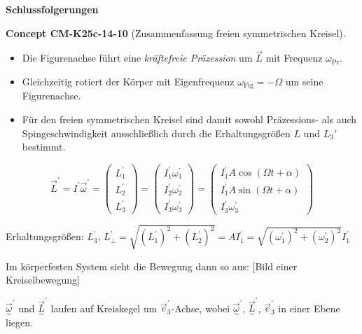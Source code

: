 \documentclass[10pt, letterpaper]{article}
\newcommand{\CustomHeading}[3]{%
  \par\medskip\noindent%
  \textbf{#1 #2} \textnormal{(#3)}.\enskip%
}
\newenvironment{CONC}[2]{\begin{unitbox}\CustomHeading{Concept}{#1}{#2}}{\end{unitbox}}
\begin{document}
\textbf{Schlussfolgerungen}

\begin{CONC}{CM-K25c-14-10}{Zusammenfassung freien symmetrischen Kreisel}
\begin{itemize}
\item Die Figurenachse führt eine \emph{kräftefreie Präzession} um
      $\vec L$ mit Frequenz $\omega_{\!\text{Pr}}$.
\item Gleichzeitig rotiert der Körper mit
      Eigenfrequenz $\omega_{\!\text{Fig}}=-\Omega$ um seine
      Figurenachse.
\item Für den freien symmetrischen Kreisel sind damit sowohl
      Präzessions- als auch Spingeschwindigkeit ausschließlich durch die
      Erhaltungsgrößen $L$ und $L_3'$ bestimmt.
\end{itemize}
\end{CONC}











\[
\vec{L}^\prime = I^\prime \vec{\omega}^\prime 
= \begin{pmatrix} L_1^\prime \\ L_2^\prime \\ L_3^\prime \end{pmatrix} 
= \begin{pmatrix} I_1^\prime \omega_1^\prime \\ I_2^\prime \omega_2^\prime \\ I_3^\prime \omega_3^\prime \end{pmatrix} 
= \begin{pmatrix} I_1^\prime A \cos(\Omega t + \alpha) \\ I_1^\prime A \sin(\Omega t + \alpha) \\ I_3^\prime \omega_3^\prime \end{pmatrix}
\]

Erhaltungsgrößen: $L_3^\prime$, $L_\perp^\prime = \sqrt{(L_1^\prime)^2+(L_2^\prime)^2} = AI_1^\prime = \sqrt{(\omega_1^\prime)^2+(\omega_2^\prime)^2}I_1^\prime$

Im körperfesten System sieht die Bewegung dann so aus: [Bild einer Kreiselbewegung]

$\vec{\underset{\sim}{\omega}}^\prime$ und $\vec{\underset{\sim}{L}}^\prime$ laufen auf Kreiskegel um $\vec{e}_3^\prime$-Achse, wobei $\vec{\underset{\sim}{\omega}}^\prime$, $\vec{\underset{\sim}{L}}^\prime$, $\vec{e}_3^\prime$ in einer Ebene liegen.
\end{document}
